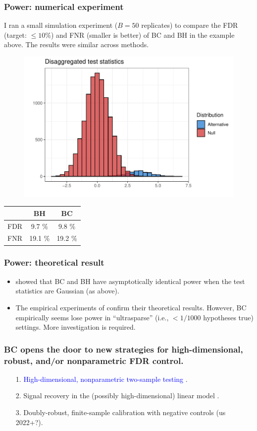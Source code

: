 \documentclass{beamer}
\begin{document}
\begin{frame}
\frametitle{Power: numerical experiment}
I ran a small simulation experiment ($B = 50$ replicates) to compare the FDR (target: $\leq 10\%$) and FNR (smaller is better) of BC and BH in the example above. The results were similar across methods.

\begin{figure}
	\centering
	\includegraphics[width=0.5\linewidth]{disag_test_stats}
\end{figure}

\centering
\begin{tabular}{|c|c|c|}
	\hline 
	& BH & BC \\ 
	\hline 
	FDR & 9.7 \% & 9.8 \% \\ 
	\hline 
	FNR & 19.1 \% & 19.2 \% \\ 
	\hline 
\end{tabular} 
\end{frame}

\begin{frame}
\frametitle{Power: theoretical result}
\begin{itemize}
\item \textcite{Arias-Castro2017} showed that BC and BH have asymptotically identical power when the test statistics are Gaussian (as above).
\item The empirical experiments of \textcite{Arias-Castro2017} confirm their theoretical results. However, BC empirically seems lose power in ``ultrasparse'' (i.e., $< 1/1000$ hypotheses true) settings. More investigation is required.
\end{itemize}
\end{frame}

\begin{frame}
\frametitle{BC opens the door to new strategies for high-dimensional, robust, and/or nonparametric FDR control.}

\begin{itemize}
\item[1.] \textcolor{blue}{High-dimensional, nonparametric two-sample testing} \parencite{Ge2021}.
\item[2.] Signal recovery in the (possibly high-dimensional) linear model \parencite{Barber2015}.
\item[3.] Doubly-robust, finite-sample calibration with negative controls (us 2022+?).
\end{itemize}
\end{frame}
\end{document}
